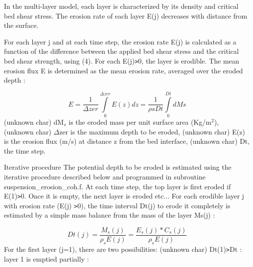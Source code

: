 In the multi-layer model, each layer is characterized by its density and
critical bed shear stress. \newline
The erosion rate of each layer E(j) decreases with distance from the surface.

For each layer j and at each time step, the erosion rate E(j) is calculated
as a function of the difference between the applied bed shear stress and the
critical bed shear strength, using (4). For each E(j)\texttt{>}0, the layer
is erodible.\newline
The mean erosion flux E is determined as the mean erosion rate, averaged
over the eroded depth :

\begin{equation*}
E=\frac{1}{\Delta zer} \int\limits_{0}^{\Delta zer}E(z)dz=\frac{1}{\rho sDt}
\int\limits_{0}^{Dt} dMs 
\end{equation*}%
(unknown char)\hspace{5mm}  dM$_{s}$ is the eroded mass per unit surface
area (Kg/m$^{2}$),\newline
(unknown char)\hspace{5mm} $\Delta$zer is the maximum depth to be eroded, 
\newline
(unknown char)\hspace{5mm} E(z) is the erosion flux (m/s) at distance z from
the bed interface,\newline
(unknown char)\hspace{5mm} Dt, the time step.

Iterative procedure \newline
The potential depth to be eroded is estimated using the iterative procedure
described below and programmed in subroutine suspension\_erosion\_coh.f.%
\newline
At each time step, the top layer is first eroded if E(1)\texttt{>}0. Once it
is empty, the next layer is eroded etc... For each erodible layer j with
erosion rate (E(j) \texttt{>}0), the time interval Dt(j) to erode it
completely is estimated by a simple mass balance from the mass of the layer
Ms(j) :

\begin{equation*}
Dt(j)=\frac{M_{s} (j)}{\rho _{s} E(j)} =\frac{E_{s} (j)*C_{s} (j)}{\rho _{s}
E(j)} 
\end{equation*}
For the first layer (j=1), there are two possibilities: \newline
(unknown char)\hspace{5mm} Dt(1)\texttt{>}Dt : layer 1 is emptied partially :


